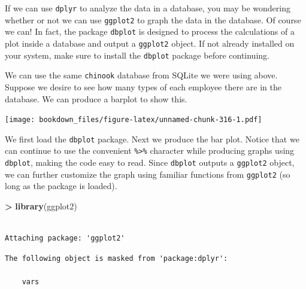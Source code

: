 \documentclass[]{krantz}
\makeatletter
\newenvironment{Shaded}{\begin{snugshade}}{\end{snugshade}}
\newcommand{\KeywordTok}[1]{\textcolor[rgb]{0.27,0.27,0.27}{\textbf{#1}}}
\newcommand{\DataTypeTok}[1]{\textcolor[rgb]{0.27,0.27,0.27}{#1}}
\newcommand{\StringTok}[1]{\textcolor[rgb]{0.5,0.5,0.5}{#1}}
\newcommand{\OperatorTok}[1]{\textcolor[rgb]{0.43,0.43,0.43}{\textbf{#1}}}
\newcommand{\NormalTok}[1]{#1}
\newenvironment{kframe}{%
\medskip{}
\setlength{\fboxsep}{.8em}
 \def\at@end@of@kframe{}%
 \ifinner\ifhmode%
  \def\at@end@of@kframe{\end{minipage}}%
  \begin{minipage}{\columnwidth}%
 \fi\fi%
 \def\FrameCommand##1{\hskip\@totalleftmargin \hskip-\fboxsep
 \colorbox{shadecolor}{##1}\hskip-\fboxsep
     \hskip-\linewidth \hskip-\@totalleftmargin \hskip\columnwidth}%
 \MakeFramed {\advance\hsize-\width
   \@totalleftmargin\z@ \linewidth\hsize
   \@setminipage}}%
 {\par\unskip\endMakeFramed%
 \at@end@of@kframe}
\renewenvironment{Shaded}{\begin{kframe}}{\end{kframe}}
\makeatother
\begin{document}
If we can use \texttt{dplyr} to analyze the data in a database, you may
be wondering whether or not we can use \texttt{ggplot2} to graph the
data in the database. Of course we can! In fact, the package
\texttt{dbplot} is designed to process the calculations of a plot inside
a database and output a \texttt{ggplot2} object. If not already
installed on your system, make sure to install the \texttt{dbplot}
package before continuing.

We can use the same \texttt{chinook} database from SQLite we were using
above. Suppose we desire to see how many types of each employee there
are in the database. We can produce a barplot to show this.

\begin{Shaded}
\end{Shaded}

\texttt{[image: bookdown\_files/figure-latex/unnamed-chunk-316-1.pdf]}

We first load the \texttt{dbplot} package. Next we produce the bar plot.
Notice that we can continue to use the convenient
\texttt{\%\textgreater{}\%} character while producing graphs using
\texttt{dbplot}, making the code easy to read. Since \texttt{dbplot}
outputs a \texttt{ggplot2} object, we can further customize the graph
using familiar functions from \texttt{ggplot2} (so long as the package
is loaded).

\begin{Shaded}
\begin{Highlighting}[]
\OperatorTok{>}\StringTok{ }\KeywordTok{library}\NormalTok{(ggplot2)}
\end{Highlighting}
\end{Shaded}

\begin{verbatim}

Attaching package: 'ggplot2'
\end{verbatim}

\begin{verbatim}
The following object is masked from 'package:dplyr':

    vars
\end{verbatim}

\begin{Shaded}
\end{Shaded}
\end{document}
